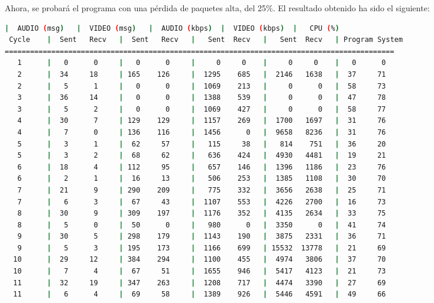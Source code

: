 \newpage

Ahora, se probará el programa con una pérdida de paquetes alta, del 25\%. El resultado obtenido ha sido el siguiente:
\vspace{\baselineskip}

\begin{adjustbox}{max width=\textwidth}
\begin{lstlisting}[language=bash,basicstyle=\ttfamily\scriptsize]
          |  AUDIO (msg)   |  VIDEO (msg)   |  AUDIO (kbps)  |  VIDEO (kbps)  |   CPU (%)
 Cycle    |  Sent   Recv   |  Sent   Recv   |   Sent  Recv   |   Sent  Recv   | Program System
============================================================================================
   1      |   0      0     |   0      0     |     0     0    |     0     0    |   0      0
   2      |  34     18     | 165    126     |  1295    685   |  2146   1638   |  37     71
   2      |   5      1     |   0      0     |  1069    213   |     0      0   |  58     73
   3      |  36     14     |   0      0     |  1388    539   |     0      0   |  47     78
   3      |   5      2     |   0      0     |  1069    427   |     0      0   |  58     77
   4      |  30      7     | 129    129     |  1157    269   |  1700   1697   |  31     76
   4      |   7      0     | 136    116     |  1456      0   |  9658   8236   |  31     76
   5      |   3      1     |  62     57     |   115     38   |   814    751   |  36     20
   5      |   3      2     |  68     62     |   636    424   |  4930   4481   |  19     21
   6      |  18      4     | 112     95     |   657    146   |  1396   1186   |  23     76
   6      |   2      1     |  16     13     |   506    253   |  1385   1108   |  30     70
   7      |  21      9     | 290    209     |   775    332   |  3656   2638   |  25     71
   7      |   6      3     |  67     43     |  1107    553   |  4226   2700   |  16     73
   8      |  30      9     | 309    197     |  1176    352   |  4135   2634   |  33     75
   8      |   5      0     |  50      0     |   980      0   |  3350      0   |  41     74
   9      |  30      5     | 298    179     |  1143    190   |  3875   2331   |  36     71
   9      |   5      3     | 195    173     |  1166    699   | 15532  13778   |  21     69
  10      |  29     12     | 384    294     |  1100    455   |  4974   3806   |  37     70
  10      |   7      4     |  67     51     |  1655    946   |  5417   4123   |  21     73
  11      |  32     19     | 347    263     |  1208    717   |  4474   3390   |  27     69
  11      |   6      4     |  69     58     |  1389    926   |  5446   4591   |  49     66

\end{lstlisting}
\end{adjustbox}
